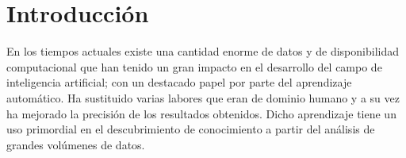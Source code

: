 \chapter*{Introducción}\label{chapter:introduction}








En los tiempos actuales existe una cantidad enorme de datos y de disponibilidad computacional que han tenido un gran impacto en el desarrollo del campo de inteligencia artificial; con un destacado papel por parte del aprendizaje automático. Ha sustituido varias labores que eran de dominio humano y a su vez ha mejorado la precisión de los resultados obtenidos. Dicho aprendizaje tiene un uso primordial en el descubrimiento de conocimiento a partir del análisis de grandes volúmenes de datos.\vspace{0.25cm}

